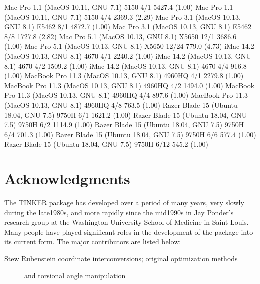 \documentclass[letterpaper,11pt,english]{sphinxmanual}
\begin{document}

\begin{sphinxVerbatim}[commandchars=\\\{\}]
Mac Pro 1.1 (MacOS 10.11, GNU 7.1)             5150           4/1      5427.4 (1.00)
Mac Pro 1.1 (MacOS 10.11, GNU 7.1)             5150           4/4      2369.3 (2.29)
Mac Pro 3.1 (MacOS 10.13, GNU 8.1)            E5462           8/1      4872.7 (1.00)
Mac Pro 3.1 (MacOS 10.13, GNU 8.1)            E5462           8/8      1727.8 (2.82)
Mac Pro 5.1 (MacOS 10.13, GNU 8.1)            X5650          12/1      3686.6 (1.00)
Mac Pro 5.1 (MacOS 10.13, GNU 8.1)            X5650         12/24       779.0 (4.73)
iMac 14.2 (MacOS 10.13, GNU 8.1)               4670           4/1      2240.2 (1.00)
iMac 14.2 (MacOS 10.13, GNU 8.1)               4670           4/2      1509.2 (1.00)
iMac 14.2 (MacOS 10.13, GNU 8.1)               4670           4/4       916.8 (1.00)
MacBook Pro 11.3 (MacOS 10.13, GNU 8.1)      4960HQ           4/1      2279.8 (1.00)
MacBook Pro 11.3 (MacOS 10.13, GNU 8.1)      4960HQ           4/2      1494.0 (1.00)
MacBook Pro 11.3 (MacOS 10.13, GNU 8.1)      4960HQ           4/4       897.6 (1.00)
MacBook Pro 11.3 (MacOS 10.13, GNU 8.1)      4960HQ           4/8       763.5 (1.00)
Razer Blade 15 (Ubuntu 18.04, GNU 7.5)        9750H           6/1      1621.2 (1.00)
Razer Blade 15 (Ubuntu 18.04, GNU 7.5)        9750H           6/2      1114.9 (1.00)
Razer Blade 15 (Ubuntu 18.04, GNU 7.5)        9750H           6/4       701.3 (1.00)
Razer Blade 15 (Ubuntu 18.04, GNU 7.5)        9750H           6/6       577.4 (1.00)
Razer Blade 15 (Ubuntu 18.04, GNU 7.5)        9750H          6/12       545.2 (1.00)
\end{sphinxVerbatim}


\chapter{Acknowledgments}
\label{\detokenize{text/acknowledgements:acknowledgments}}\label{\detokenize{text/acknowledgements::doc}}
The TINKER package has developed over a period of many years, very slowly during the late\sphinxhyphen{}1980s, and more rapidly since the mid\sphinxhyphen{}1990s in Jay Ponder’s research group at the Washington University School of Medicine in Saint Louis. Many people have played significant roles in the development of the package into its current form. The major contributors are listed below:
\begin{description}
\item[{Stew Rubenstein coordinate interconversions; original optimization methods}] \leavevmode
and torsional angle manipulation

\end{description}
\end{document}
